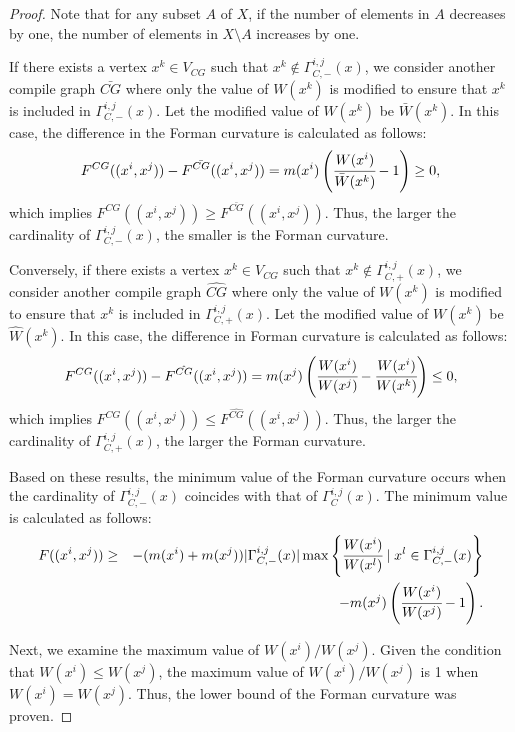 \documentclass[10pt,a4paper]{amsart}
\begin{document}
\begin{proof}
    Note that for any subset $A$ of $X$, if the number of elements in $A$ decreases by one, the number of elements in $X\setminus A$ increases by one.

    If there exists a vertex $x^k \in V_{CG}$ such that $x^k \notin \Gamma_{C,-}^{i,j}(x)$, we consider another compile graph $\bar{CG}$ where only the value of $W(x^k)$ is modified to ensure that $x^k$ is included in $\Gamma_{C,-}^{i,j}(x)$. Let the modified value of $W(x^k)$ be $\bar{W}(x^k)$. In this case, the difference in the Forman curvature is calculated as follows:
    \begin{eqnarray*}
        F^{CG}((x^i,x^j)) - F^{\bar{CG}}((x^i,x^j)) = m(x^i) \left( \cfrac{W(x^i)}{\bar{W}(x^k)} - 1\right) \geq 0,
    \end{eqnarray*}
    which implies $F^{CG}((x^i,x^j)) \geq F^{\bar{CG}}((x^i,x^j))$. Thus, the larger the cardinality of $\Gamma_{C,-}^{i,j}(x)$, the smaller is the Forman curvature.

    Conversely, if there exists a vertex $x^k \in V_{CG}$ such that $x^k \notin \Gamma_{C,+}^{i,j}(x)$, we consider another compile graph $\hat{CG}$ where only the value of $W(x^k)$ is modified to ensure that $x^k$ is included in $\Gamma_{C,+}^{i,j}(x)$. Let the modified value of $W(x^k)$ be $\hat{W}(x^k)$. In this case, the difference in Forman curvature is calculated as follows:
    \begin{eqnarray*}
        F^{CG}((x^i,x^j)) - F^{\hat{CG}}((x^i,x^j)) = m(x^j) \left( \cfrac{W(x^i)}{W(x^j)} - \cfrac{W(x^i)}{W(x^k)}\right) \leq 0,
    \end{eqnarray*}
    which implies $F^{CG}((x^i,x^j)) \leq F^{\hat{CG}}((x^i,x^j))$. Thus, the larger the cardinality of $\Gamma_{C,+}^{i,j}(x)$, the larger  the Forman curvature.

    Based on these results, the minimum value of the Forman curvature occurs when the cardinality of $\Gamma_{C,-}^{i,j}(x)$ coincides with that of $\Gamma_C^{i,j}(x)$. The minimum value is calculated as follows:
    \begin{eqnarray*}
        F((x^i,x^j)) 
        &\geq& -(m(x^i)+m(x^j)) |\Gamma^{i,j}_{C,-} (x)|\max \left\{ \cfrac{W(x^i)}{W(x^l)} \mid x^l \in \Gamma^{i,j}_{C,-}(x)\right\} \nonumber\\
        &\ & - m(x^j)\left(\cfrac{W(x^i)}{W(x^j)} -1 \right).
    \end{eqnarray*}

    Next, we examine the maximum value of $W(x^i)/W(x^j)$. Given the condition that $W(x^i) \leq W(x^j)$, the maximum value of $W(x^i)/W(x^j)$ is 1 when $W(x^i)=W(x^j)$. Thus, the lower bound of the Forman curvature was proven.
\end{proof}
\end{document}
